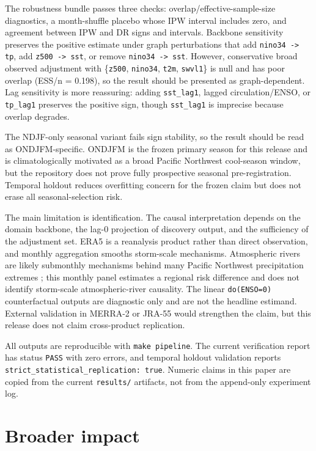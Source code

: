 \documentclass{article}
\begin{document}
The robustness bundle passes three checks: overlap/effective-sample-size diagnostics, a month-shuffle placebo whose IPW interval includes zero, and agreement between IPW and DR signs and intervals. Backbone sensitivity preserves the positive estimate under graph perturbations that add \texttt{nino34 -> tp}, add \texttt{z500 -> sst}, or remove \texttt{nino34 -> sst}. However, conservative broad observed adjustment with \{\texttt{z500}, \texttt{nino34}, \texttt{t2m}, \texttt{swvl1}\} is null and has poor overlap (ESS/n = 0.198), so the result should be presented as graph-dependent. Lag sensitivity is more reassuring: adding \texttt{sst\_lag1}, lagged circulation/ENSO, or \texttt{tp\_lag1} preserves the positive sign, though \texttt{sst\_lag1} is imprecise because overlap degrades.

The NDJF-only seasonal variant fails sign stability, so the result should be read as ONDJFM-specific. ONDJFM is the frozen primary season for this release and is climatologically motivated as a broad Pacific Northwest cool-season window, but the repository does not prove fully prospective seasonal pre-registration. Temporal holdout reduces overfitting concern for the frozen claim but does not erase all seasonal-selection risk.

The main limitation is identification. The causal interpretation depends on the domain backbone, the lag-0 projection of discovery output, and the sufficiency of the adjustment set. ERA5 is a reanalysis product rather than direct observation, and monthly aggregation smooths storm-scale mechanisms. Atmospheric rivers are likely submonthly mechanisms behind many Pacific Northwest precipitation extremes \citep{dettiger2011climate}; this monthly panel estimates a regional risk difference and does not identify storm-scale atmospheric-river causality. The linear \texttt{do(ENSO=0)} counterfactual outputs are diagnostic only and are not the headline estimand. External validation in MERRA-2 or JRA-55 would strengthen the claim, but this release does not claim cross-product replication.

All outputs are reproducible with \texttt{make pipeline}. The current verification report has status \texttt{PASS} with zero errors, and temporal holdout validation reports \texttt{strict\_statistical\_replication: true}. Numeric claims in this paper are copied from the current \texttt{results/} artifacts, not from the append-only experiment log.

\section*{Broader impact}
\end{document}
